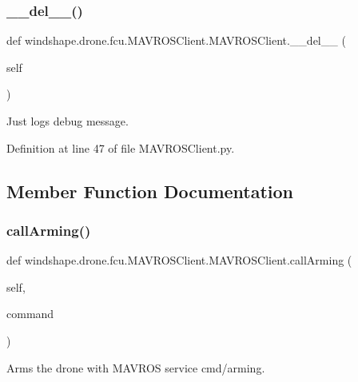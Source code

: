 \subsubsection{\texorpdfstring{\+\_\+\+\_\+del\+\_\+\+\_\+()}{\_\_del\_\_()}}
{\footnotesize\ttfamily def windshape.\+drone.\+fcu.\+M\+A\+V\+R\+O\+S\+Client.\+M\+A\+V\+R\+O\+S\+Client.\+\_\+\+\_\+del\+\_\+\+\_\+ (\begin{DoxyParamCaption}\item[{}]{self }\end{DoxyParamCaption})}

\begin{DoxyVerb}Just logs debug message.\end{DoxyVerb}
 

Definition at line 47 of file M\+A\+V\+R\+O\+S\+Client.\+py.



\subsection{Member Function Documentation}
\mbox{\label{classwindshape_1_1drone_1_1fcu_1_1_m_a_v_r_o_s_client_1_1_m_a_v_r_o_s_client_a7ccde40ffe0ec0eb71d096c8b2a75dbd}} 
\subsubsection{\texorpdfstring{call\+Arming()}{callArming()}}
{\footnotesize\ttfamily def windshape.\+drone.\+fcu.\+M\+A\+V\+R\+O\+S\+Client.\+M\+A\+V\+R\+O\+S\+Client.\+call\+Arming (\begin{DoxyParamCaption}\item[{}]{self,  }\item[{}]{command }\end{DoxyParamCaption})}

\begin{DoxyVerb}Arms the drone with MAVROS service cmd/arming.\end{DoxyVerb}
 

